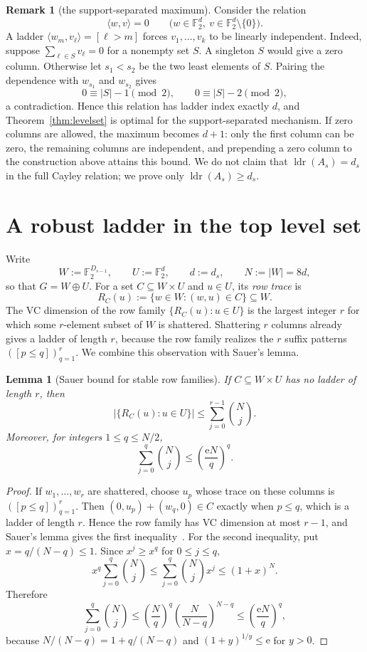 \documentclass[11pt]{article}
\theoremstyle{plain}
\newtheorem{lemma}[theorem]{Lemma}
\theoremstyle{definition}
\newtheorem{remark}[theorem]{Remark}
\numberwithin{theorem}{section}
\newcommand{\F}{\mathbb{F}}
\newcommand{\inner}[2]{\langle #1,#2\rangle}
\newcommand{\abs}[1]{\lvert #1\rvert}
\newcommand{\ldr}{\operatorname{ldr}}
\newcommand{\econst}{\mathrm e}
\begin{document}
\begin{remark}[the support-separated maximum]\label{rem:exact}
Consider the relation
\[
  \inner{w}{v}=0
  \qquad\bigl(w\in\F_2^d,\ v\in\F_2^d\setminus\{0\}\bigr).
\]
A ladder $\inner{w_m}{v_\ell}=[\ell>m]$ forces
$v_1,\dots,v_k$ to be linearly independent.  Indeed, suppose
$\sum_{\ell\in S}v_\ell=0$ for a nonempty set $S$.  A singleton $S$ would
give a zero column.  Otherwise let $s_1<s_2$ be the two least elements of
$S$.  Pairing the dependence with $w_{s_1}$ and $w_{s_2}$ gives
\[
  0\equiv\abs S-1\pmod2,
  \qquad
  0\equiv\abs S-2\pmod2,
\]
a contradiction.  Hence this relation has ladder index exactly $d$, and
Theorem~\ref{thm:levelset} is optimal for the support-separated mechanism.
If zero columns are allowed, the maximum becomes $d+1$: only the first
column can be zero, the remaining columns are independent, and prepending a
zero column to the construction above attains this bound.  We do not
claim that $\ldr(A_s)=d_s$ in the full Cayley relation; we prove only
$\ldr(A_s)\ge d_s$.
\end{remark}

\section{A robust ladder in the top level set}\label{sec:robust}

Write
\[
  W:=\F_2^{D_{s-1}},\qquad U:=\F_2^{d},\qquad d:=d_s,
  \qquad N:=\abs W=8d,
\]
so that $G=W\oplus U$.  For a set $C\subseteq W\times U$ and $u\in U$, its
\emph{row trace} is
\[
  R_C(u):=\{w\in W:(w,u)\in C\}\subseteq W.
\]
The VC dimension of the row family $\{R_C(u):u\in U\}$ is the largest
integer $r$ for which some $r$-element subset of $W$ is shattered.  Shattering
$r$ columns already gives a ladder of length $r$, because the row family
realizes the $r$ suffix patterns $([p\le q])_{q=1}^r$.  We combine this
observation with Sauer's lemma.

\begin{lemma}[Sauer bound for stable row families]\label{lem:trace-bound}
If $C\subseteq W\times U$ has no ladder of length $r$, then
\[
  \abs{\{R_C(u):u\in U\}}
  \le \sum_{j=0}^{r-1}\binom Nj.
\]
Moreover, for integers $1\le q\le N/2$,
\[
  \sum_{j=0}^{q}\binom Nj\le\left(\frac{\econst N}{q}\right)^q.
\]
\end{lemma}

\begin{proof}
If $w_1,\dots,w_r$ are shattered, choose $u_p$ whose trace on these columns
is $([p\le q])_{q=1}^r$.  Then $(0,u_p)+(w_q,0)\in C$ exactly when $p\le q$,
which is a ladder of length $r$.  Hence the row family has VC dimension at
most $r-1$, and Sauer's lemma gives the first inequality~\cite{Sauer}.  For
the second inequality, put $x=q/(N-q)\le1$.  Since $x^j\ge x^q$ for
$0\le j\le q$,
\[
  x^q\sum_{j=0}^{q}\binom Nj
  \le \sum_{j=0}^{q}\binom Nj x^j
  \le (1+x)^N.
\]
Therefore
\[
  \sum_{j=0}^{q}\binom Nj
  \le \left(\frac Nq\right)^q
       \left(\frac N{N-q}\right)^{N-q}
  \le \left(\frac{\econst N}{q}\right)^q,
\]
because $N/(N-q)=1+q/(N-q)$ and $(1+y)^{1/y}\le\econst$ for $y>0$.
\end{proof}
\end{document}
